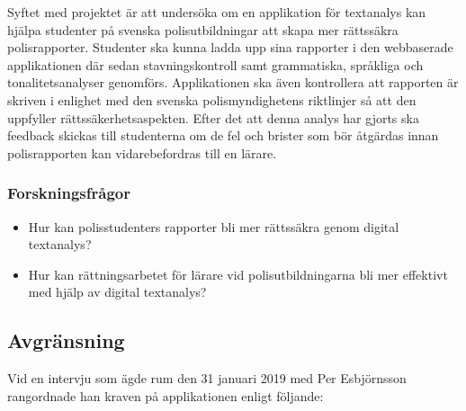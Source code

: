 \documentclass[swedish]{maucsthesis}
\begin{document}
Syftet med projektet är att undersöka om en applikation för textanalys kan
hjälpa studenter på svenska polisutbildningar att skapa mer rättssäkra
polisrapporter. Studenter ska kunna ladda upp sina rapporter i den webbaserade
applikationen där sedan stavningskontroll samt grammatiska, språkliga och
tonalitetsanalyser genomförs. Applikationen ska även kontrollera att rapporten
är skriven i enlighet med den svenska polismyndighetens riktlinjer så att den
uppfyller rättssäkerhetsaspekten. Efter det att denna analys har gjorts ska
feedback skickas till studenterna om de fel och brister som bör åtgärdas innan
polisrapporten kan vidarebefordras till en lärare.

\subsubsection{Forskningsfrågor}

\begin{itemize}
\item Hur kan polisstudenters rapporter bli mer rättssäkra genom digital
  textanalys?
\item Hur kan rättningsarbetet för lärare vid polisutbildningarna bli mer
  effektivt med hjälp av digital textanalys?
\end{itemize}

\subsection{Avgränsning}\label{avgränsning}

Vid en intervju som ägde rum den 31 januari 2019 med Per Esbjörnsson rangordnade
han kraven på applikationen enligt följande:
\end{document}
